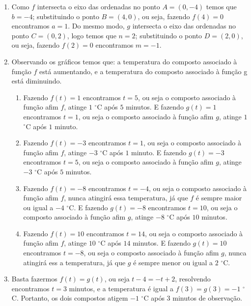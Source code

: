 \documentclass[10 pt,usenames,dvipsnames, oneside]{article}
\begin{document}
\ifdefined\prof
\begin{solucao}
\begin{enumerate}

\item Como $f$ intersecta o eixo das ordenadas no ponto $A=(0,−4)$ temos que $b=−4$; substituindo o ponto $B=(4,0)$, ou seja, fazendo $f(4)=0$ encontramos $a=1$. Do mesmo modo, $g$ intersecta o eixo das ordenadas no ponto $C=(0,2)$, logo temos que $n=2$; substituindo o ponto $D=(2,0)$, ou seja, fazendo $f(2)=0$ encontramos $m=−1$.

\item Observando os gráficos temos que: a temperatura do composto associado à função $f$ está aumentando, e a temperatura do composto associado à função g está diminuindo.
\begin{enumerate}
\item Fazendo $f(t)=1$ encontramos $t=5$, ou seja o composto associado à função afim $f$, atinge $1$ $^{\circ}$C após $5$ minutos. E fazendo $g(t)=1$ encontramos $t=1$, ou seja o composto associado à função afim $g$, atinge $1$ $^{\circ}$C após $1$ minuto.

\item Fazendo $f(t)=−3$ encontramos $t=1$, ou seja o composto associado à função afim $f$, atinge $−3$ $^{\circ}$C após $1$ minuto. E fazendo $g(t)=−3$ encontramos $t=5$, ou seja o composto associado à função afim $g$, atinge $−3$ $^{\circ}$C após $5$ minutos.

\item Fazendo $f(t)=−8$ encontramos $t=−4$, ou seja o composto associado à função afim $f$, nunca atingirá essa temperatura, já que $f$ é sempre maior ou igual a $−4$ $^{\circ}$C. E fazendo $g(t)=−8$ encontramos $t=10$, ou seja o composto associado à função afim $g$, atinge $−8$ $^{\circ}$C após $10$ minutos.

\item Fazendo $f(t)=10$ encontramos $t=14$, ou seja o composto associado à função afim $f$, atinge $10$ $^{\circ}$C após $14$ minutos. E fazendo $g(t)=10$ encontramos $t=−8$, ou seja o composto associado à função afim $g$, nunca atingirá ess a temperatura, já que $g$ é sempre menor ou igual a $2$ $^{\circ}$C.

\end{enumerate}
\item Basta fazermos $f(t)=g(t)$, ou seja $t−4=−t+2$, resolvendo encontramos $t=3$ minutos, e a temperatura é igual a $f(3)=g(3)=−1$ $^{\circ}$C. Portanto, os dois compostos atigem $−1$ $^{\circ}$C após $3$ minutos de observação.


\end{enumerate}
\end{solucao}
\fi
\end{document}
